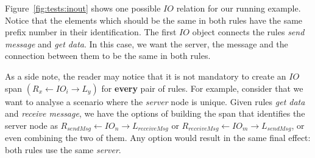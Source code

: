 \begin{example}\label{ex:inout} Figure~\ref{fig:tests:inout} shows one possible $IO$ relation for our running example. Notice that the elements which should be the same in both rules have the same prefix number in their identification. The first $IO$ object connects the rules \emph{send message} and \emph{get data}.  In this case, we want the server, the message and the connection between them to be the same in both rules. %

As a side note, the reader may notice that it is not mandatory to create an $IO$ span \mbox{$\left(R_x \leftarrow IO_i \rightarrow L_y\right)$} for \textbf{every} pair of rules. For example, consider that we want to analyse a scenario where the \emph{server} node is unique. Given rules \emph{get data} and \emph{receive message}, we have the options of building the span that identifies the server node as
  $R_{sendMsg} \leftarrow IO_n \rightarrow L_{receiveMsg}$ or $R_{receiveMsg} \leftarrow IO_m \rightarrow L_{sendMsg}$, or even combining the two of them. Any option would result in the same final effect: both rules use the same \emph{server}.
  \begin{figure}[!ht]
  \centering

\end{figure}
\end{example}
